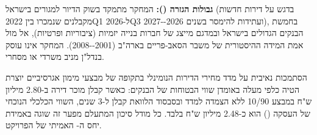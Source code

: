 \textbf{גבולות הגזרה ():} המחקר מתמקד בשוק הדיור למגורים בישראל (בדגש על דירות חדשות מקבלנים שנמכרו בין \num{2022Q1} ל-\num{2026Q3} ועתידות להימסר בשנים \num{2026--2027}), בחמשת הבנקים הגדולים בישראל ובמדגם מייצג של חברות בנייה יזמיות (ציבוריות ופרטיות), אל מול אמת המידה ההיסטורית של משבר הסאב-פריים בארה"ב (\num{2001--2008}). המחקר אינו עוסק בנדל"ן מניב משרדי או מסחרי.

\begin{warningbox}
הסתמכות נאיבית על מדד מחירי הדירות הנומינלי בתקופה של מבצעי מימון אגרסיביים יוצרת הטיה כלפי מעלה באומדן שווי הבטוחות של הבנקים: כאשר קבלן מוכר דירה ב-\num{2.80} מיליון ש"ח במבצע \num{10/90} ללא הצמדה למדד ובסבסוד הלוואת קבלן ל-\num{3} שנים, השווי הכלכלי הנוכחי של העסקה () הוא כ-\num{2.48} מיליון ש"ח בלבד. כל מודל סיכון המתעלם מפער זה שוגה באמידת יחס ה- האמיתי של הפרויקט.
\end{warningbox}
